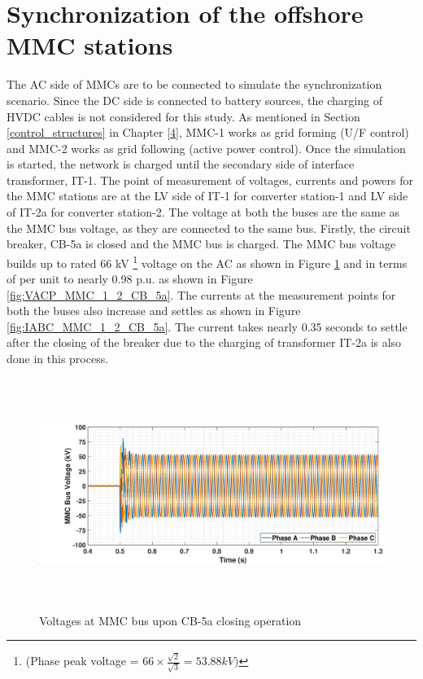 \section{Synchronization of the offshore MMC stations}
The \gls{AC} side of \gls{MMC}s are to be connected to simulate the synchronization scenario. Since the \gls{DC} side is connected to battery sources, the charging of \gls{HVDC} cables is not considered for this study. As mentioned in Section \ref{control_structures} in Chapter \ref{4}, \gls{MMC}-1 works as grid forming (U/F control) and \gls{MMC}-2 works as grid following (active power control). Once the simulation is started, the network is charged until the secondary side of interface transformer, IT-1. The point of measurement of voltages, currents and powers for the \gls{MMC} stations are at the \gls{LV} side of IT-1 for converter station-1 and \gls{LV} side of IT-2a for converter station-2. The voltage at both the buses are the same as the \gls{MMC} bus voltage, as they are connected to the same bus. Firstly, the circuit breaker, CB-5a is closed and the \gls{MMC} bus is charged. The \gls{MMC} bus voltage builds up to rated 66 kV \footnote{(Phase peak voltage = $66\times \frac{\sqrt{2}}{\sqrt{3}} = 53.88 kV)$} voltage on the \gls{AC} as shown in Figure \ref{fig:VABC_MMC_1_2_CB_5a} and in terms of per unit to nearly 0.98 p.u. as shown in Figure \ref{fig:VACP_MMC_1_2_CB_5a}. The currents at the measurement points for both the buses also increase and settles as shown in Figure \ref{fig:IABC_MMC_1_2_CB_5a}. The current takes nearly 0.35 seconds to settle after the closing of the breaker due to the charging of transformer IT-2a is also done in this process. 

\begin{figure}[H]
    \includegraphics[height = 7.5cm,width = \textwidth]{Diagrams/Chapter_5/VABC_MMC_1_2_CB_5a.eps}
    \caption{Voltages at MMC bus upon CB-5a closing operation}
    \label{fig:VABC_MMC_1_2_CB_5a}
\end{figure}


